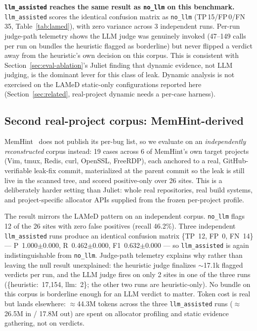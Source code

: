 \documentclass[11pt,a4paper]{article}
\begin{document}
\textbf{\texttt{llm\_assisted} reaches the same result as \texttt{no\_llm}
on this benchmark.} \texttt{llm\_assisted} scores the identical confusion
matrix as \texttt{no\_llm} (TP\,15/FP\,0/FN\,35, Table~\ref{tab:lamed}), with
zero variance across 3 independent runs. Per-run judge-path telemetry shows
the LLM judge was genuinely invoked (47--149 calls per run on bundles the
heuristic flagged as borderline) but never flipped a verdict away from the
heuristic's own decision on this corpus. This is consistent with
Section~\ref{sec:eval-ablation}'s Juliet finding that
dynamic evidence, not LLM judging, is the dominant lever for this class of
leak. Dynamic analysis is not exercised on the LAMeD static-only
configurations reported here (Section~\ref{sec:related}, real-project
dynamic needs a per-case harness).

\subsection{Second real-project corpus: MemHint-derived}
\label{sec:eval-memhint}

MemHint~\cite{memhint} does not publish its per-bug list, so we evaluate
on an \emph{independently reconstructed} corpus instead: 19 cases across 6
of MemHint's own target projects (Vim, tmux, Redis, curl, OpenSSL,
FreeRDP), each anchored to a real, GitHub-verifiable leak-fix commit,
materialized at the parent commit so the leak is still live in the scanned
tree, and scored positive-only over 26 sites. This is a deliberately
harder setting than Juliet: whole real repositories, real build systems,
and project-specific allocator APIs supplied from the frozen per-project
profile.

The result mirrors the LAMeD pattern on an independent corpus.
\texttt{no\_llm} flags 12 of the 26 sites with zero false positives
(recall 46.2\%). Three independent \texttt{llm\_assisted} runs produce an
identical confusion matrix \{TP~12, FP~0, FN~14\} --- P~1.000$\pm$0.000,
R~0.462$\pm$0.000, F1~0.632$\pm$0.000 --- so \texttt{llm\_assisted} is
again indistinguishable from \texttt{no\_llm}. Judge-path telemetry
explains why rather than leaving the null result unexplained: the
heuristic judge finalizes $\sim$17.1k flagged verdicts per run, and the
LLM judge fires on only 2 sites in one of the three runs
(\{heuristic:~17,154, llm:~2\}; the other two runs are heuristic-only).
No bundle on this corpus is borderline enough for an LLM verdict to
matter. Token cost is real but lands elsewhere: $\approx$44.3M tokens
across the three \texttt{llm\_assisted} runs ($\approx$26.5M in / 17.8M
out) are spent on allocator profiling and static evidence gathering, not
on verdicts.
\end{document}
